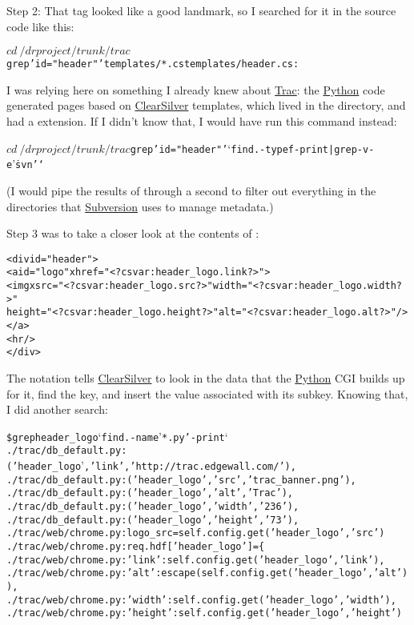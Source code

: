 \documentclass{report}
\begin{document}
Step 2: That  tag looked like a good landmark,
so I searched for it in the source code like this:

\begin{alltt}
$ cd ~/drproject/trunk/trac
$ grep 'id="header"' templates/*.cs templates/header.cs:
\end{alltt}

I was relying here on something I already knew about \url{Trac}: the
\url{Python} code generated pages based on \url{ClearSilver}
templates, which lived in the  directory, and had a
 extension.  If I didn't know that, I would have run this
command instead:

\begin{alltt}
$ cd ~/drproject/trunk/trac
$ grep 'id="header"' `find . -type f -print | grep -v -e '\.svn'`
\end{alltt}

\noindent (I would pipe the results of  through a second
 to filter out everything in the  directories
that \url{Subversion} uses to manage metadata.)

Step 3 was to take a closer look at the contents of :

\begin{alltt}
<div id="header">
  <a id="logo" xhref="<?cs var:header_logo.link ?>">
    <img xsrc="<?cs var:header_logo.src ?>" width="<?cs var:header_logo.width ?>"
     height="<?cs var:header_logo.height ?>" alt="<?cs var:header_logo.alt ?>"/>
  </a>
  <hr/>
</div>
\end{alltt}

The notation  tells \url{ClearSilver} to
look in the data that the \url{Python} CGI builds up for it, find the
 key, and insert the value associated with its
 subkey.  Knowing that, I did another search:

\begin{alltt}
\$ grep header_logo `find . -name '*.py' -print`
./trac/db_default.py:  ('header_logo', 'link', 'http://trac.edgewall.com/'),
./trac/db_default.py:  ('header_logo', 'src', 'trac_banner.png'),
./trac/db_default.py:  ('header_logo', 'alt', 'Trac'),
./trac/db_default.py:  ('header_logo', 'width', '236'),
./trac/db_default.py:  ('header_logo', 'height', '73'),
./trac/web/chrome.py:      logo_src = self.config.get('header_logo', 'src')
./trac/web/chrome.py:      req.hdf['header_logo'] = \{
./trac/web/chrome.py:        'link': self.config.get('header_logo', 'link'),
./trac/web/chrome.py:        'alt': escape(self.config.get('header_logo', 'alt')),
./trac/web/chrome.py:        'width': self.config.get('header_logo', 'width'),
./trac/web/chrome.py:        'height': self.config.get('header_logo', 'height')
\end{alltt}
\end{document}
